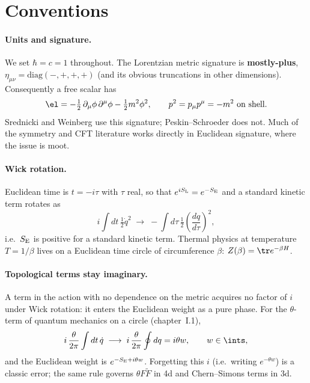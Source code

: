 \section{Conventions}
\label{app:conventions}

\paragraph{Units and signature.} We set $\hbar = c = 1$ throughout. The Lorentzian metric signature is \textbf{mostly-plus}, $\eta_{\mu\nu} = \mathrm{diag}(-,+,+,+)$ (and its obvious truncations in other dimensions). Consequently a free scalar has
\begin{equation}
\el = -\tfrac{1}{2}\,\partial_\mu \phi\, \partial^\mu \phi - \tfrac{1}{2} m^2 \phi^2 ,
\qquad p^2 = p_\mu p^\mu = -m^2 \ \text{on shell}.
\end{equation}
Srednicki and Weinberg use this signature; Peskin--Schroeder does not. Much of the symmetry and CFT literature works directly in Euclidean signature, where the issue is moot.

\paragraph{Wick rotation.} Euclidean time is $t = -i\tau$ with $\tau$ real, so that $e^{iS_{\rm L}} = e^{-S_{\rm E}}$ and a standard kinetic term rotates as
\begin{equation}
i \int dt\, \tfrac{1}{2} \dot q^2 \;\longrightarrow\; - \int d\tau\, \tfrac{1}{2} \left(\frac{dq}{d\tau}\right)^{\!2},
\end{equation}
i.e.\ $S_{\rm E}$ is positive for a standard kinetic term. Thermal physics at temperature $T = 1/\beta$ lives on a Euclidean time circle of circumference $\beta$: $Z(\beta) = \tr e^{-\beta H}$.

\paragraph{Topological terms stay imaginary.} A term in the action with no dependence on the metric acquires no factor of $i$ under Wick rotation: it enters the Euclidean weight as a pure phase. For the $\theta$-term of quantum mechanics on a circle (chapter~I.1),
\begin{equation}
i \,\frac{\theta}{2\pi} \int dt\, \dot q \;\longrightarrow\; i\, \frac{\theta}{2\pi} \oint dq = i\theta w, \qquad w \in \ints,
\end{equation}
and the Euclidean weight is $e^{-S_{\rm E} + i\theta w}$. Forgetting this $i$ (i.e.\ writing $e^{-\theta w}$) is a classic error; the same rule governs $\theta F\tilde F$ in 4d and Chern--Simons terms in 3d.

